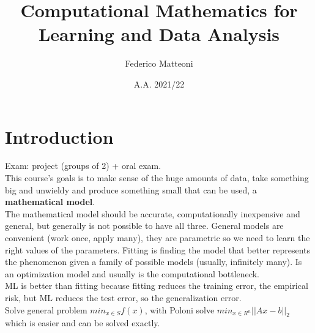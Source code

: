 \documentclass[10pt]{report}
\begin{document}
\title{Computational Mathematics for Learning and Data Analysis}
\author{Federico Matteoni}
\date{A.A. 2021/22}
\renewcommand*\contentsname{Index}

\maketitle
\begin{multicols}{2}
\tableofcontents
\end{multicols}
\pagebreak
\section{Introduction}
Exam: project (groups of 2) + oral exam.\\
This course's goals is to make sense of the huge amounts of data, take something big and unwieldy and produce something small that can be used, a \textbf{mathematical model}.\\
The mathematical model should be accurate, computationally inexpensive and general, but generally is not possible to have all three. General models are convenient (work once, apply many), they are parametric so we need to learn the right values of the parameters. Fitting is finding the model that better represents the phenomenon given a family of possible models (usually, infinitely many). Is an optimization model and usually is the computational bottleneck.\\
ML is better than fitting because fitting reduces the training error, the empirical risk, but ML reduces the test error, so the generalization error.\\
Solve general problem $min_{x\in S}f(x)$, with Poloni solve $min_{x\in R^n}||Ax - b||_2$ which is easier and can be solved exactly.
\end{document}
